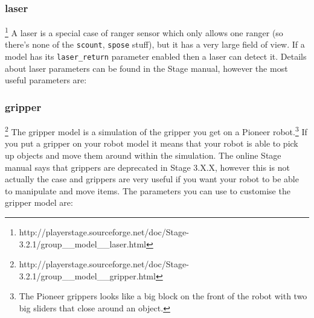 \documentclass[a4paper]{report}
\begin{document}
\subsubsection{laser}\footnote{http://playerstage.sourceforge.net/doc/Stage-3.2.1/group\_\_model\_\_laser.html}
A laser is a special case of ranger sensor which only allows one ranger (so there's none of the \verb|scount|, \verb|spose| stuff), but it has a very large field of view. 
If a model has its \verb|laser_return| parameter enabled then a laser can detect it. Details about laser parameters can be found in the Stage manual, however the most useful parameters are:

\subsubsection{gripper}\footnote{http://playerstage.sourceforge.net/doc/Stage-3.2.1/group\_\_model\_\_gripper.html}\label{sec:gripper}
The gripper model is a simulation of the gripper you get on a Pioneer robot.\footnote{The Pioneer grippers looks like a big block on the front of the robot with two big sliders that close around an object.} If you put a gripper on your robot model it means that your robot is able to pick up objects and move them around within the simulation. The online Stage manual says that grippers are deprecated in Stage 3.X.X, however this is not actually the case and grippers are very useful if you want your robot to be able to manipulate and move items. The parameters you can use to customise the gripper model are:
\end{document}
